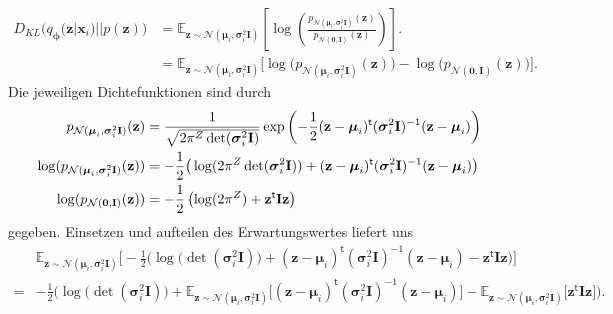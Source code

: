 \documentclass[12pt]{article}
\newcommand{\z}{\mathbf{z}}
\begin{document}
	\begin{align*}
	D_{KL}\big(q_{\boldsymbol\phi}(\textbf{z}|\textbf{x}_{i}) || p(\textbf{z})\big) &= \mathbb{E}_{\z\sim\mathcal{N}(\boldsymbol\mu_{i},\boldsymbol\sigma_{i}^{2}\mathbf{I})}\left[\log\left(\frac{p_{\mathcal{N}(\boldsymbol\mu_{i},\boldsymbol\sigma_{i}^{2}\mathbf{I})}(\textbf{z})}{p_{\mathcal{N}(\mathbf{0},\mathbf{I})}(\textbf{z})}\right)\right].\\
	&= \mathbb{E}_{\z\sim\mathcal{N}(\boldsymbol\mu_{i},\boldsymbol\sigma_{i}^{2}\mathbf{I})}\big[\log\big(p_{\mathcal{N}(\boldsymbol\mu_{i},\boldsymbol\sigma_{i}^{2}\mathbf{I})}(\textbf{z})\big)
	- \log\big(p_{\mathcal{N}(\mathbf{0},\mathbf{I})}(\textbf{z})\big)\big].
	\end{align*}
	Die jeweiligen Dichtefunktionen sind durch
	\begin{align*}
	p_{\mathcal{N}(\boldsymbol\mu_{i},\boldsymbol\sigma_{i}^{2}\mathbf{I})}(\textbf{z})&= \frac{1}{\sqrt{2\pi^{Z} \det(\boldsymbol\sigma_{i}^{2}\mathbf{I})}}\exp\left(-\frac{1}{2}(\textbf{z}-\boldsymbol\mu_{i})^{\mathsf{t}}(\boldsymbol\sigma_{i}^{2}\mathbf{I})^{-1}(\textbf{z}-\boldsymbol\mu_{i})\right) \notag \\
	\log(p_{\mathcal{N}(\boldsymbol\mu_{i},\boldsymbol\sigma_{i}^{2}\mathbf{I})}(\textbf{z}))&= -\frac{1}{2}\big(\log(2\pi^{Z} \det(\boldsymbol\sigma_{i}^{2}\mathbf{I}))+(\textbf{z}-\boldsymbol\mu_{i})^{\mathsf{t}}(\boldsymbol\sigma_{i}^{2}\mathbf{I})^{-1}(\textbf{z}-\boldsymbol\mu_{i})\big)\\ \notag
	\log(p_{\mathcal{N}(\mathbf{0},\mathbf{I})}(\textbf{z}))&= -\frac{1}{2}\left(\log(2\pi^{Z} )+\textbf{z}^{\mathsf{t}}\mathbf{I}\textbf{z}\right)
	\end{align*}
	gegeben. Einsetzen und aufteilen des Erwartungswertes liefert uns
	\begin{align*}
	&\mathbb{E}_{\z\sim\mathcal{N}(\boldsymbol\mu_{i},\boldsymbol\sigma_{i}^{2}\mathbf{I})}\Big[-\frac{1}{2}\Big(\log\big(\det(\boldsymbol\sigma_{i}^{2}\mathbf{I})\big)+(\textbf{z}-\boldsymbol\mu_{i})^{\mathsf{t}}(\boldsymbol\sigma_{i}^{2}\mathbf{I})^{-1}(\textbf{z}-\boldsymbol\mu_{i})-\textbf{z}^{\mathsf{t}}\mathbf{I}\textbf{z}\Big)\Big]\\
	=
	&-\frac{1}{2}\Big(\log\big(\det(\boldsymbol\sigma_{i}^{2}\mathbf{I})\big)+\mathbb{E}_{\z\sim\mathcal{N}(\boldsymbol\mu_{i},\boldsymbol\sigma_{i}^{2}\mathbf{I})}\big[(\textbf{z}-\boldsymbol\mu_{i})^{\mathsf{t}}(\boldsymbol\sigma_{i}^{2}\mathbf{I})^{-1}(\textbf{z}-\boldsymbol\mu_{i})\big]-\mathbb{E}_{\z\sim\mathcal{N}(\boldsymbol\mu_{i},\boldsymbol\sigma_{i}^{2}\mathbf{I})}\big[\textbf{z}^{\mathsf{t}}\mathbf{I}\textbf{z}\big]\Big).
	\end{align*}
\end{document}
